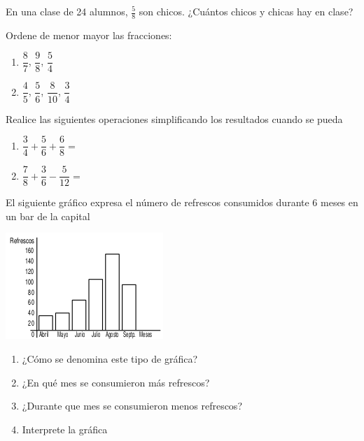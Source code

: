 \documentclass[letterpaper,fleqn]{article}
\begin{document}
\begin{enumerate}
\begin{minipage}{.35\textwidth}
\end{minipage}
\item En una clase de 24 alumnos, $\frac{5}{8}$ son chicos. ¿Cuántos chicos y chicas hay en clase?\noanswer
\item Ordene de menor  mayor las fracciones:
\begin{enumerate}
\item $\dfrac{8}{7}$, $\dfrac{9}{8}$, $\dfrac{5}{4}$\noanswer
\item $\dfrac{4}{5}$, $\dfrac{5}{6}$, $\dfrac{8}{10}$, $\dfrac{3}{4}$\noanswer
\end{enumerate}
\item Realice las siguientes operaciones simplificando los resultados cuando se pueda
\begin{enumerate}
\item $\dfrac{3}{4}+\dfrac{5}{6}+\dfrac{6}{8}=$\noanswer
\item $\dfrac{7}{8}+\dfrac{3}{6}-\dfrac{5}{12}=$\noanswer
\end{enumerate}
\begin{minipage}{.45\textwidth}
\item El siguiente gr\'{a}fico expresa el n\'{u}mero de refrescos consumidos durante 6 meses en un bar de la capital
\end{minipage} \hfill
\begin{minipage}{.55\textwidth}
\includegraphics[scale=1]{Images/barras.png} 
\end{minipage}
\begin{enumerate}
\item ¿Cómo se denomina este tipo de gráfica?\noanswer
\item ¿En qué mes se consumieron más refrescos?\noanswer
\item ¿Durante que mes se consumieron menos refrescos?\noanswer
\item Interprete la gráfica\noanswer
\end{enumerate}
 \end{enumerate}
\end{document}
